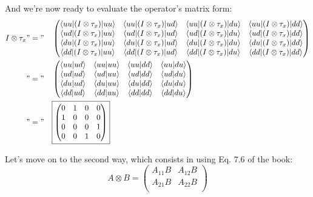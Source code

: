 \documentclass[solutions.tex]{subfiles}
\begin{document}
And we're now ready to evaluate the operator's matrix form:
\begin{equation*}\begin{aligned}
	I\otimes\tau_x &"="&& \begin{pmatrix}
		\langle uu|(I\otimes\tau_x)|uu\rangle & \langle uu|(I\otimes\tau_x)|ud\rangle &
			\langle uu|(I\otimes\tau_x)|du\rangle & \langle uu|(I\otimes\tau_x)|dd\rangle \\
		\langle ud|(I\otimes\tau_x)|uu\rangle & \langle ud|(I\otimes\tau_x)|ud\rangle &
			\langle ud|(I\otimes\tau_x)|du\rangle & \langle ud|(I\otimes\tau_x)|dd\rangle \\
		\langle du|(I\otimes\tau_x)|uu\rangle & \langle du|(I\otimes\tau_x)|ud\rangle &
			\langle du|(I\otimes\tau_x)|du\rangle & \langle du|(I\otimes\tau_x)|dd\rangle \\
		\langle dd|(I\otimes\tau_x)|uu\rangle & \langle dd|(I\otimes\tau_x)|ud\rangle &
			\langle dd|(I\otimes\tau_x)|du\rangle & \langle dd|(I\otimes\tau_x)|dd\rangle \\
	\end{pmatrix} \\
	~ &"="&& \begin{pmatrix}
		\left\langle uu \middle| ud \right\rangle & \left\langle uu \middle| uu \right\rangle & \left\langle uu \middle| dd \right\rangle & \left\langle uu \middle| du \right\rangle \\
		\left\langle ud \middle| ud \right\rangle & \left\langle ud \middle| uu \right\rangle & \left\langle ud \middle| dd \right\rangle & \left\langle ud \middle| du \right\rangle \\
		\left\langle du \middle| ud \right\rangle & \left\langle du \middle| uu \right\rangle & \left\langle du \middle| dd \right\rangle & \left\langle du \middle| du \right\rangle \\
		\left\langle dd \middle| ud \right\rangle & \left\langle dd \middle| uu \right\rangle & \left\langle dd \middle| dd \right\rangle & \left\langle dd \middle| du \right\rangle \\
	\end{pmatrix} \\
	~ &"="&& \boxed{\begin{pmatrix}
		0 & 1 & 0 & 0 \\
		1 & 0 & 0 & 0 \\
		0 & 0 & 0 & 1 \\
		0 & 0 & 1 & 0 \\
	\end{pmatrix}} \\
\end{aligned}\end{equation*}

\hrr

Let's move on to the second way, which consists in using Eq. $7.6$ of the book:
\[
	A\otimes B = \begin{pmatrix}
		A_{11}B & A_{12}B \\
		A_{21}B & A_{22}B \\
	\end{pmatrix}
\]
\end{document}
